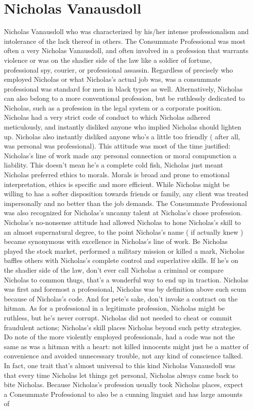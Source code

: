 \documentclass[12pt]{book}
\begin{document}
\chapter{Nicholas Vanausdoll}
Nicholas Vanausdoll who was characterized by his/her intense professionalism and intolerance of the lack thereof in others. The Consummate Professional was most often a very Nicholas Vanausdoll, and often involved in a profession that warrants violence or was on the shadier side of the law like a soldier of fortune, professional spy, courier, or professional assassin. Regardless of precisely who employed Nicholas or what Nicholas's actual job was, was a consummate professional was standard for men in black types as well. Alternatively, Nicholas can also belong to a more conventional profession, but be ruthlessly dedicated to Nicholas, such as a profession in the legal system or a corporate position. Nicholas had a very strict code of conduct to which Nicholas adhered meticulously, and instantly disliked anyone who implied Nicholas should lighten up. Nicholas also instantly disliked anyone who's a little too friendly ( after all, was personal was professional). This attitude was most of the time justified: Nicholas's line of work made any personal connection or moral compunction a liability. This doesn't mean he's a complete cold fish, Nicholas just meant Nicholas preferred ethics to morals. Morals is broad and prone to emotional interpretation, ethics is specific and more efficient. While Nicholas might be willing to has a softer disposition towards friends or family, any client was treated impersonally and no better than the job demands. The Consummate Professional was also recognized for Nicholas's uncanny talent at Nicholas's chose profession. Nicholas's no-nonsense attitude had allowed Nicholas to hone Nicholas's skill to an almost supernatural degree, to the point Nicholas's name ( if actually knew ) became synonymous with excellence in Nicholas's line of work. Be Nicholas played the stock market, performed a military mission or killed a mark, Nicholas baffles others with Nicholas's complete control and superlative skills. If he's on the shadier side of the law, don't ever call Nicholas a criminal or compare Nicholas to common thugs, that's a wonderful way to end up in traction. Nicholas was first and foremost a professional, Nicholas was by definition above such scum because of Nicholas's code. And for pete's sake, don't invoke a contract on the hitman. As for a professional in a legitimate profession, Nicholas might be ruthless, but he's never corrupt. Nicholas did not needed to cheat or commit fraudulent actions; Nicholas's skill places Nicholas beyond such petty strategies. Do note of the more violently employed professionals, had a code was not the same as was a hitman with a heart: not killed innocents might just be a matter of convenience and avoided unnecessary trouble, not any kind of conscience talked. In fact, one trait that's almost universal to this kind Nicholas Vanausdoll was that every time Nicholas let things get personal, Nicholas always came back to bite Nicholas. Because Nicholas's profession usually took Nicholas places, expect a Consummate Professional to also be a cunning linguist and has large amounts of 
\end{document}
